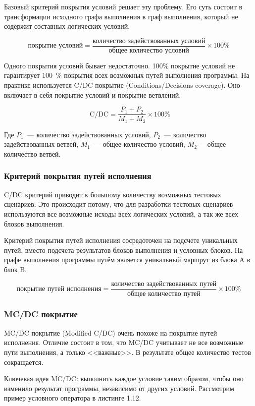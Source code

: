 Базовый критерий покрытия условий решает эту проблему. Его суть состоит в трансформации исходного графа выполнения в граф выполнения, который не содержит составных логических условий. 

\[ \text{покрытие условий} = \frac{\text{количество задействованных условий}}{\text{общее количество условий}}  \times 100 \% \]

Одного покрытия условий бывает недостаточно. 100\% покрытие условий не гарантирует 100~\% покрытия всех возможных путей выполнения программы. На практике используется C/DC покрытие (Conditions/Decisions coverage). Оно включает в себя покрытие условий и покрытие ветвлений.

\[ \text{ C/DC} = \frac{P_1 + P_2}{M_1 + M_2} \times 100 \% \]

Где \(P_1\)~--- количество задействованных условий, \(P_2\)~--- количество задействованных ветвей, \(M_1\)~--- общее количество условий, \(M_2\)~---общее количество ветвей.

\subsubsection{Критерий покрытия путей исполнения}

C/DC критерий приводит к большому количеству возможных тестовых сценариев. Это происходит потому, что для разработки тестовых сценариев используются все возможные исходы всех логических условий, а так же всех блоков выполнения.

Критерий покрытия путей исполнения сосредоточен на подсчете уникальных путей, вместо подсчета результатов блоков выполнения и условных блоков. На графе выполнения программы путём является уникальный маршрут из блока A в блок B.

\[ \text{покрытие путей исполнения} = \frac{\text{количество задействованных путей}}{\text{общее количество путей}}  \times 100 \% \]

\subsubsection{MC/DC покрытие}

MC/DC покрытие (Modified C/DC) очень похоже на покрытие путей исполнения. Отличие состоит в том, что MC/DC учитывает не все возможные пути выполнения, а только <<важные>>. В результате общее количество тестов сокращается.

Ключевая идея MC/DC: выполнить каждое условие таким образом, чтобы оно изменило результат программы, независимо от других условий. Рассмотрим пример условного оператора в листинге 1.12.


